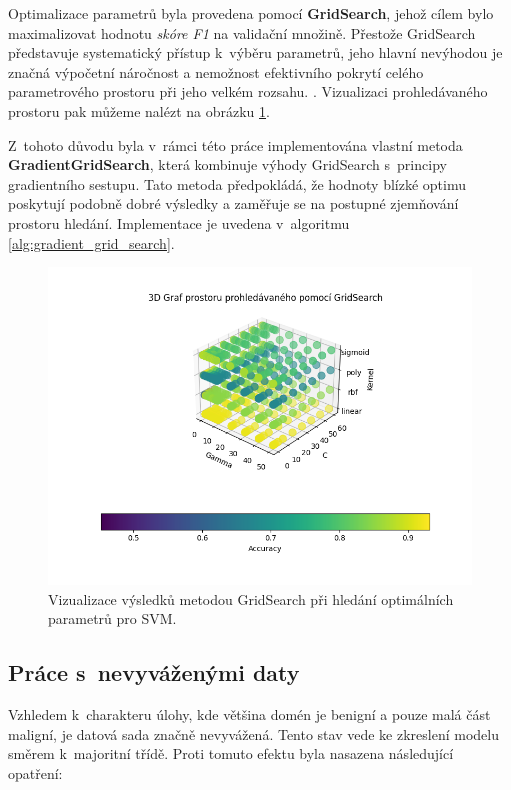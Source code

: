 \noindent Optimalizace parametrů byla provedena pomocí \textbf{GridSearch}, jehož cílem bylo maximalizovat hodnotu \textit{skóre F1} na validační množině. Přestože GridSearch představuje systematický přístup k~výběru parametrů, jeho hlavní nevýhodou je značná výpočetní náročnost a nemožnost efektivního pokrytí celého parametrového prostoru při jeho velkém rozsahu. \cite{bergstra2011algorithms}. Vizualizaci prohledávaného prostoru pak můžeme nalézt na obrázku \ref{chart:grid_search}.

Z~tohoto důvodu byla v~rámci této práce implementována vlastní metoda \textbf{GradientGridSearch}, která kombinuje výhody GridSearch s~principy gradientního sestupu. Tato metoda předpokládá, že hodnoty blízké optimu poskytují podobně dobré výsledky a zaměřuje se na postupné zjemňování prostoru hledání. Implementace je uvedena v~algoritmu \ref{alg:gradient_grid_search}.

\begin{figure}[h!]
  \centering
  \includegraphics[width=1.0\textwidth]{obrazky-figures/grid.png}
  \caption{Vizualizace výsledků metodou GridSearch při hledání optimálních parametrů pro SVM.}
  \label{chart:grid_search}
\end{figure}


\subsection{Práce s~nevyváženými daty}

Vzhledem k~charakteru úlohy, kde většina domén je benigní a pouze malá část maligní, je datová sada značně nevyvážená. Tento stav vede ke zkreslení modelu směrem k~majoritní třídě. Proti tomuto efektu byla nasazena následující opatření:

